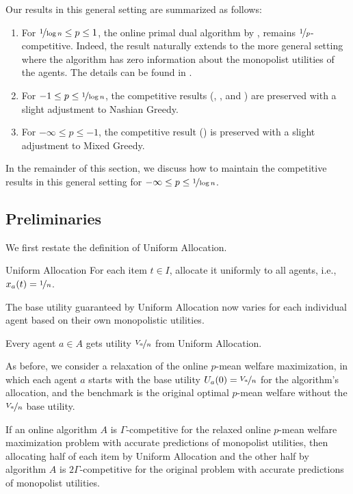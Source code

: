 \documentclass[11pt,letterpaper]{article}
\begin{document}
Our results in this general setting are summarized as follows:

\begin{enumerate}
	\item For $\nicefrac{1}{\log n}\le p\le 1$, the online primal dual algorithm by \citet{DevanurJ:STOC:2012}, remains $\nicefrac{1}{p}$-competitive. Indeed, the result naturally extends to the more general setting where the algorithm has zero information about the monopolist utilities of the agents. The details can be found in .
	
	\item For $-1\le p\le \nicefrac{1}{\log n}$, the competitive results (, , and ) are preserved with a slight adjustment to Nashian Greedy.
	
	\item For $-\infty\le p\le -1$, the competitive result () is preserved with a slight adjustment to Mixed Greedy.
\end{enumerate}

In the remainder of this section, we discuss how to maintain the competitive results in this general setting for $-\infty \leq p \leq \nicefrac{1}{\log n}$.


\subsection{Preliminaries}

We first restate the definition of Uniform Allocation.

\begin{algorithm}{Uniform Allocation}
	For each item $t \in I$, allocate it uniformly to all agents, i.e., $x_a(t) = \nicefrac{1}{n}$.
\end{algorithm}

The base utility guaranteed by Uniform Allocation now varies for each individual agent based on their own monopolistic utilities.

\begin{lemma}
	\label{lem:unif-app}
	Every agent $a \in A$ gets utility $\nicefrac{V_a}{n}$ from Uniform Allocation.
\end{lemma}

As before, we consider a relaxation of the online $p$-mean welfare maximization, in which each agent $a$ starts with the base utility $U_a(0) = \nicefrac{V_a}{n}$ for the algorithm's allocation, and the benchmark is the original optimal $p$-mean welfare without the $\nicefrac{V_a}{n}$ base utility.
\begin{lemma}
	\label{lem:relaxation-app}
	If an online algorithm $A$ is $\Gamma$-competitive for the relaxed online $p$-mean welfare maximization problem with accurate predictions of monopolist utilities, then allocating half of each item by Uniform Allocation and the other half by algorithm $A$ is $2 \Gamma$-competitive for the original problem with accurate predictions of monopolist utilities.
\end{lemma}
\end{document}
